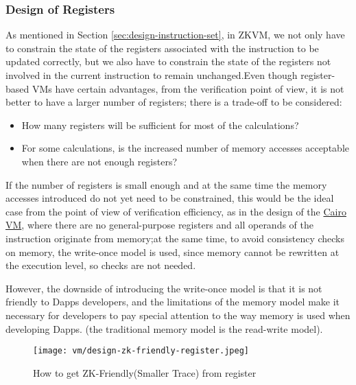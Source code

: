 \subsubsection{Design of Registers} \label{sec:design-registers}

As mentioned in Section \ref{sec:design-instruction-set}, in ZKVM, we not only have to constrain the state of the registers associated with
the instruction to be updated correctly, but we also have to constrain the state of the registers not involved in the current
instruction to remain unchanged.Even though register-based VMs have certain advantages, from the verification point of view,
it is not better to have a larger number of registers; there is a trade-off to be considered:

\begin{itemize}
    \item How many registers will be sufficient for most of the calculations?
    \item For some calculations, is the increased number of memory accesses acceptable when there are not enough registers?
\end{itemize}

If the number of registers is small enough and at the same time the memory accesses introduced do not yet need to be constrained,
this would be the ideal case from the point of view of verification efficiency, as in the design of the \href{https://starkware.co/cairo/}{Cairo VM}, where there are
no general-purpose registers and all operands of the instruction originate from memory;at the same time, to avoid consistency checks
on memory, the write-once model is used, since memory cannot be rewritten at the execution level, so checks are not needed.

However, the downside of introducing the write-once model is that it is not friendly to Dapps developers, and the limitations of
the memory model make it necessary for developers to pay special attention to the way memory is used when developing Dapps.
(the traditional memory model is the read-write model).

\begin{figure}[!ht]
    \centering
    \texttt{[image: vm/design-zk-friendly-register.jpeg]}
    \caption{How to get ZK-Friendly(Smaller Trace) from register}
    \label{fig:design-zk-friendly-register}
\end{figure}

